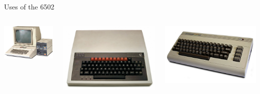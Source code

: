 \begin{frame}{Uses of the 6502}
	\begin{columns}
		\begin{column}{0.32\textwidth}
			\pause\includegraphics[width=\textwidth]{appleii}
		\end{column}
		\begin{column}{0.32\textwidth}
			\pause\includegraphics[width=\textwidth]{bbcmicro}
		\end{column}
		\begin{column}{0.32\textwidth}
			\pause\includegraphics[width=\textwidth]{Commodore64}

\end{column}
\end{columns}
\end{frame}
